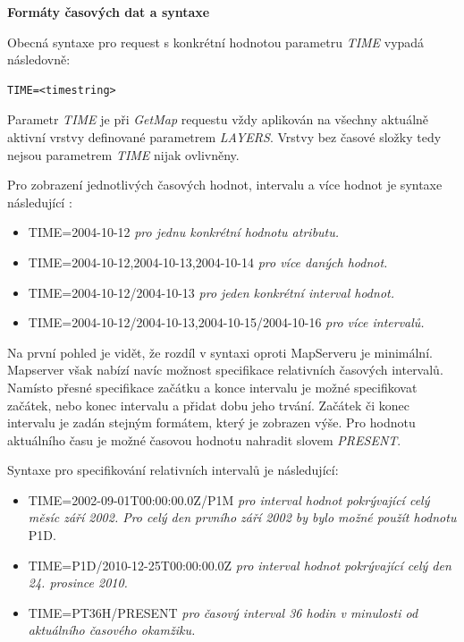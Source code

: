 \bigskip
\noindent
\textbf{Formáty časových dat a syntaxe}

\noindent
Obecná syntaxe pro request s konkrétní hodnotou parametru \textit{TIME} vypadá následovně: 

\begin{verbatim}
TIME=<timestring>
\end{verbatim}

Parametr \textit{TIME} je při \textit{GetMap} requestu vždy aplikován na všechny aktuálně aktivní vrstvy definované parametrem \textit{LAYERS}. Vrstvy bez časové složky tedy nejsou parametrem \textit{TIME} nijak ovlivněny.

Pro zobrazení jednotlivých časových hodnot, intervalu a více hodnot je syntaxe následující \cite{geoserver-time}: 

\begin{itemize}
	\item TIME=2004-10-12 \textit{pro jednu konkrétní hodnotu atributu.}
	\item TIME=2004-10-12,2004-10-13,2004-10-14 \textit{pro více daných hodnot.}
	\item TIME=2004-10-12/2004-10-13 \textit{pro jeden konkrétní interval hodnot.}
	\item TIME=2004-10-12/2004-10-13,2004-10-15/2004-10-16 \textit{pro více intervalů.}
\end{itemize}

Na první pohled je vidět, že rozdíl v syntaxi oproti MapServeru je minimální. Mapserver však nabízí navíc možnost specifikace relativních časových intervalů. Namísto přesné specifikace začátku a konce intervalu je možné specifikovat začátek, nebo konec intervalu a přidat dobu jeho trvání. Začátek či konec intervalu je zadán stejným formátem, který je zobrazen výše. Pro hodnotu aktuálního času je možné časovou hodnotu nahradit slovem \textit{PRESENT}.

Syntaxe pro specifikování relativních intervalů je následující\cite{geoserver-time}:

\begin{itemize}
	\item TIME=2002-09-01T00:00:00.0Z/P1M \textit{pro interval hodnot pokrývající celý měsíc září 2002. Pro celý den prvního září 2002 by bylo možné použít hodnotu} P1D.
	\item TIME=P1D/2010-12-25T00:00:00.0Z \textit{pro interval hodnot pokrývající celý den 24. prosince 2010.}
	\item TIME=PT36H/PRESENT \textit{pro časový interval 36 hodin v minulosti od aktuálního časového okamžiku.}
\end{itemize}

